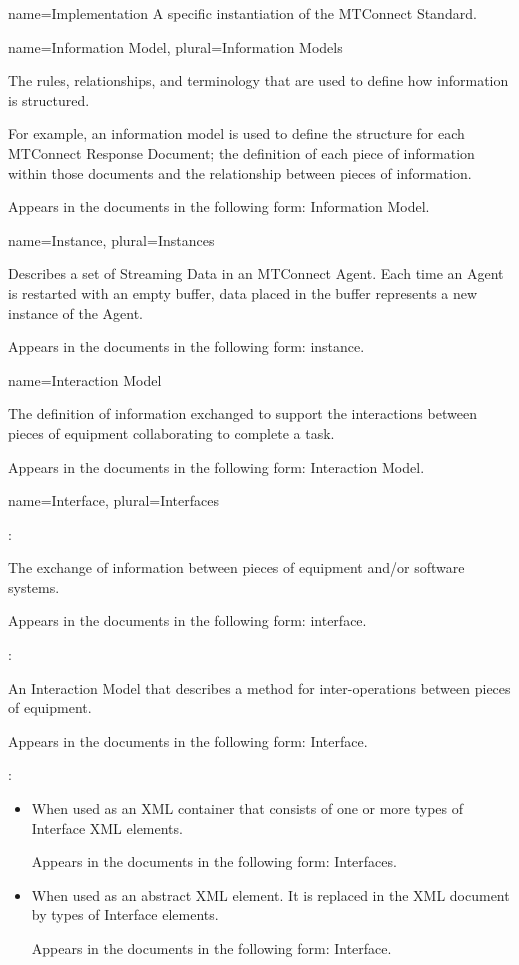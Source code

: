 {
  name={Implementation}
}
{
	A specific instantiation of the MTConnect Standard.
}


{
  name={Information Model},
  plural={Information Models}
}
{
	The rules, relationships, and terminology that are used to define how information is structured.

	For example, an information model is used to define the structure for each MTConnect Response Document; the definition of each piece of information within those documents and the relationship between pieces of information.

	Appears in the documents in the following form: Information Model.
}


{
  name={Instance},
  plural={Instances}
}
{
	Describes a set of Streaming Data in an MTConnect Agent.  Each time an Agent is restarted with an empty buffer, data placed in the buffer represents a new instance of the Agent.

	Appears in the documents in the following form: instance.
}


{
  name={Interaction Model}
}
{
	The definition of information exchanged to support the interactions between pieces of equipment collaborating to complete a task.

	Appears in the documents in the following form: Interaction Model.
}


{
  name={Interface},
  plural={Interfaces}
}
{
	:

	The exchange of information between pieces of equipment and/or software systems.

	Appears in the documents in the following form: interface.

	:

	An Interaction Model that describes a method for inter-operations between pieces of equipment.

	Appears in the documents in the following form: Interface.

	:

    \begin{itemize}
	\item When used as an XML container that consists of one or more types of Interface XML elements.

	Appears in the documents in the following form: Interfaces.

	\item When used as an abstract XML element.  It is replaced in the XML document by types of Interface elements.

	Appears in the documents in the following form: Interface.
	\end{itemize}
}


